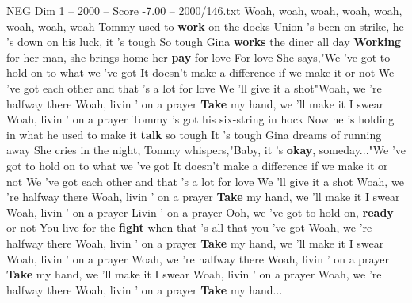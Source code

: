 \begin{textsample}{NEG Dim 1 – 2000 – Score -7.00 – 2000/146.txt}  \label{ex:f1_neg_019}
Woah, woah, woah, woah, woah, woah, woah, woah Tommy used to \textbf{work} on the docks Union 's been on strike, he 's down on his luck, it 's tough So tough Gina \textbf{works} the diner all day \textbf{Working} for her man, she brings home her \textbf{pay} for love For love She says,"We 've got to hold on to what we 've got It doesn't make a difference if we make it or not We 've got each other and that 's a lot for love We 'll give it a shot"Woah, we 're halfway there Woah, livin ' on a prayer \textbf{Take} my hand, we 'll make it I swear Woah, livin ' on a prayer Tommy 's got his six-string in hock Now he 's holding in what he used to make it \textbf{talk} so tough It 's tough Gina dreams of running away She cries in the night, Tommy whispers,"Baby, it 's \textbf{okay}, someday..."We 've got to hold on to what we 've got It doesn't make a difference if we make it or not We 've got each other and that 's a lot for love We 'll give it a shot Woah, we 're halfway there Woah, livin ' on a prayer \textbf{Take} my hand, we 'll make it I swear Woah, livin ' on a prayer Livin ' on a prayer Ooh, we 've got to hold on, \textbf{ready} or not You live for the \textbf{fight} when that 's all that you 've got Woah, we 're halfway there Woah, livin ' on a prayer \textbf{Take} my hand, we 'll make it I swear Woah, livin ' on a prayer Woah, we 're halfway there Woah, livin ' on a prayer \textbf{Take} my hand, we 'll make it I swear Woah, livin ' on a prayer Woah, we 're halfway there Woah, livin ' on a prayer \textbf{Take} my hand...

\end{textsample}
